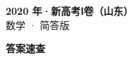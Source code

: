 \documentclass[zihao=-4, a4paper]{ctexart}
\begin{document}
\begin{center}
  {\Large\bfseries 2020 年·新高考Ⅰ卷（山东）}\\[4pt]
  {\large 数学 · 简答版}
\end{center}
\medskip
{}

\clearpage
{}
\begin{center}{\Large\bfseries 答案速查}\end{center}
\medskip

\end{document}

